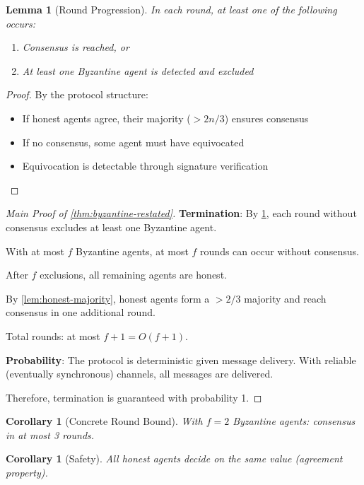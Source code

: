 \documentclass[
]{article}
\newtheorem{lemma}[theorem]{Lemma}
\newtheorem{corollary}[theorem]{Corollary}
\begin{document}
\begin{lemma}[Round Progression]
\label{lem:round-progression}
In each round, at least one of the following occurs:
\begin{enumerate}
\item Consensus is reached, or
\item At least one Byzantine agent is detected and excluded
\end{enumerate}
\end{lemma}

\begin{proof}
By the protocol structure:
\begin{itemize}
\item If honest agents agree, their majority ($> 2n/3$) ensures consensus
\item If no consensus, some agent must have equivocated
\item Equivocation is detectable through signature verification
\end{itemize}
\end{proof}

\begin{proof}[Main Proof of \cref{thm:byzantine-restated}]
\textbf{Termination}: By \cref{lem:round-progression}, each round without consensus excludes at least one Byzantine agent.

With at most $f$ Byzantine agents, at most $f$ rounds can occur without consensus.

After $f$ exclusions, all remaining agents are honest.

By \cref{lem:honest-majority}, honest agents form a $> 2/3$ majority and reach consensus in one additional round.

Total rounds: at most $f + 1 = O(f + 1)$.

\textbf{Probability}: The protocol is deterministic given message delivery. With reliable (eventually synchronous) channels, all messages are delivered.

Therefore, termination is guaranteed with probability 1.
\end{proof}

\begin{corollary}[Concrete Round Bound]
\label{cor:concrete-rounds}
With $f = 2$ Byzantine agents: consensus in at most 3 rounds.
\end{corollary}

\begin{corollary}[Safety]
\label{cor:consensus-safety}
All honest agents decide on the same value (agreement property).
\end{corollary}
\end{document}
